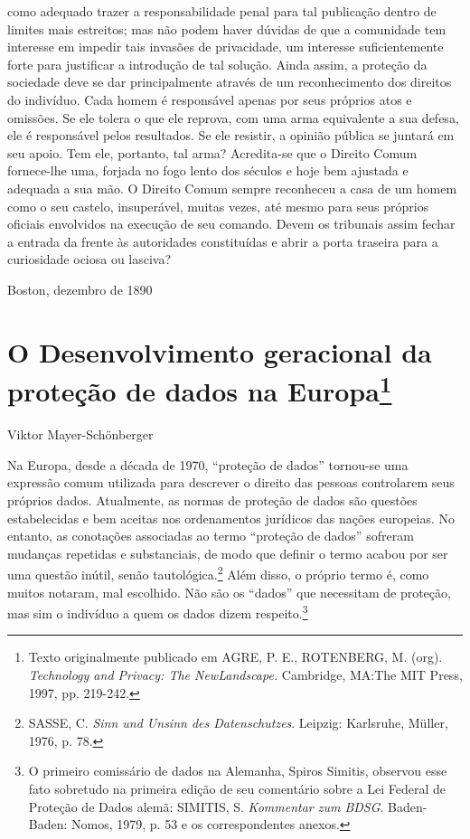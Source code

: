 como adequado trazer a responsabilidade penal para tal publicação dentro
de limites mais estreitos; mas não podem haver dúvidas de que a
comunidade tem interesse em impedir tais invasões de privacidade, um
interesse suficientemente forte para justificar a introdução de tal
solução. Ainda assim, a proteção da sociedade deve se dar principalmente
através de um reconhecimento dos direitos do indivíduo. Cada homem é
responsável apenas por seus próprios atos e omissões. Se ele tolera o
que ele reprova, com uma arma equivalente a sua defesa, ele é
responsável pelos resultados. Se ele resistir, a opinião pública se
juntará em seu apoio. Tem ele, portanto, tal arma? Acredita-se que o
Direito Comum fornece-lhe uma, forjada no fogo lento dos séculos e hoje
bem ajustada e adequada a sua mão. O Direito Comum sempre reconheceu a
casa de um homem como o seu castelo, insuperável, muitas vezes, até
mesmo para seus próprios oficiais envolvidos na execução de seu comando.
Devem os tribunais assim fechar a entrada da frente às autoridades
constituídas e abrir a porta traseira para a curiosidade ociosa ou
lasciva?

Boston, dezembro de 1890

\chapter{O Desenvolvimento geracional da proteção de dados na
Europa\footnote{Texto originalmente publicado em
  AGRE, P. E., ROTENBERG, M. (org). \emph{Technology and Privacy: The
  NewLandscape.} Cambridge, MA:The MIT Press, 1997, pp. 219-242.}}\label{o-desenvolvimento-geracional-da-proteuxe7uxe3o-de-dados-na-europa}

Viktor Mayer-Schönberger

Na Europa, desde a década de 1970, ``proteção de dados'' tornou-se uma
expressão comum utilizada para descrever o direito das pessoas
controlarem seus próprios dados. Atualmente, as normas de proteção de
dados são questões estabelecidas e bem aceitas nos ordenamentos
jurídicos das nações europeias. No entanto, as conotações associadas ao
termo ``proteção de dados'' sofreram mudanças repetidas e substanciais,
de modo que definir o termo acabou por ser uma questão inútil, senão
tautológica.\footnote{SASSE, C. \emph{Sinn und Unsinn des
  Datenschutzes}. Leipzig: Karlsruhe, Müller, 1976, p. 78.} Além disso,
o próprio termo é, como muitos notaram, mal escolhido. Não são os
``dados'' que necessitam de proteção, mas sim o indivíduo a quem os
dados dizem respeito.\footnote{O primeiro comissário de dados na
  Alemanha, Spiros Simitis, observou esse fato sobretudo na primeira
  edição de seu comentário sobre a Lei Federal de Proteção de Dados
  alemã: SIMITIS, S. \emph{Kommentar zum BDSG}. Baden-Baden: Nomos,
  1979, p. 53 e os correspondentes anexos.}

